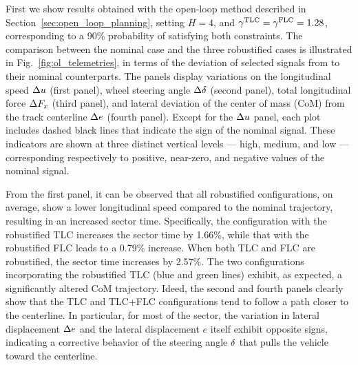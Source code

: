 First we show results obtained with the open-loop method described in Section~\ref{sec:open_loop_planning}, setting $H=4$, and $\gamma^\textrm{TLC}=\gamma^\textrm{FLC}=1.28$, corresponding to a 90\% probability of satisfying both constraints.
The comparison between the nominal case and the three robustified cases is illustrated in Fig.~\ref{fig:ol_telemetries}, in terms of the deviation of selected signals from to their nominal counterparts.
The panels display variations on the longitudinal speed $\Delta u$ (first panel), wheel steering angle $\Delta \delta$ (second panel), total longitudinal force $\Delta F_x$ (third panel), and lateral deviation of the center of mass (CoM) from the track centerline $\Delta e$ (fourth panel).
Except for the $\Delta u$ panel, each plot includes dashed black lines that indicate the sign of the nominal signal.
These indicators are shown at three distinct vertical levels --- high, medium, and low --- corresponding respectively to positive, near-zero, and negative values of the nominal signal.


From the first panel, it can be observed that all robustified configurations, on average, show a lower longitudinal speed compared to the nominal trajectory, resulting in an increased sector time. Specifically, the configuration with the robustified TLC increases the sector time by 1.66\%, while that with the robustified FLC leads to a 0.79\% increase. When both TLC and FLC are robustified, the sector time increases by 2.57\%.
The two configurations incorporating the robustified TLC (blue and green lines) exhibit, as expected, a significantly altered CoM trajectory.
Ideed, the second and fourth panels clearly show that the TLC and TLC+FLC configurations tend to follow a path closer to the centerline. In particular, for most of the sector, the variation in lateral displacement $\Delta e$ and the lateral displacement $e$ itself exhibit opposite signs, indicating a corrective behavior of the steering angle $\delta$ that pulls the vehicle toward the centerline.


